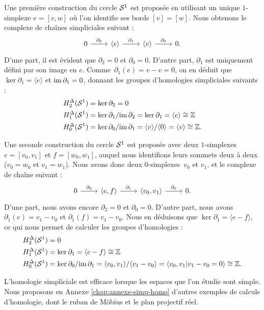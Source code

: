 \begin{exemple}
Une première construction du cercle $\mathcal{S}^{1}$ est proposée en utilisant un unique $1$-simplexe $e=[v,w]$ où l'on identifie ses bords $[v]=[w]$. Nous obtenons le complexe de chaînes simpliciales suivant :
\[\begin{tikzcd}
0\arrow[r,"\partial_2"]& \langle e\rangle\arrow[r, "\partial_1"]&\langle v\rangle\arrow[r,"\partial_0"]&0.
\end{tikzcd}\]
D'une part, il est évident que $\partial_2=0$ et $\partial_0=0$. D'autre part, $\partial_1$ est uniquement défini par son image en $e$. Comme~$\partial_1(e)=v-v=0$, on en déduit que $\ker\partial_1=\langle e\rangle$ et $\mathrm{im}\,\partial_1=0$, donnant les groupes d'homologies simpliciales suivants :
\[\begin{split}
    H^\Delta_2(\mathcal{S}^{1}) &= \ker\partial_2 = 0 \\
    H^\Delta_1(\mathcal{S}^{1}) &= \ker\partial_1/\mathrm{im}\,\partial_2 = \ker\partial_1 = \langle e \rangle\cong\mathbb{Z} \\
    H^\Delta_0(\mathcal{S}^{1}) &= \ker\partial_0/\mathrm{im}\,\partial_1 = \langle v \rangle/\langle 0 \rangle = \langle v \rangle\cong\mathbb{Z}.
\end{split}\]

Une seconde construction du cercle $\mathcal{S}^{1}$ est proposée avec deux $1$-simplexes $e=[v_0,v_1]$ et $f=[w_0,w_1]$, auquel nous identifions leurs sommets deux à deux ($v_0=w_0$ et $v_1=w_1$). Nous avons donc deux $0$-simplexes~$v_0$ et $v_1$, et le complexe de chaîne suivant : 
\[\begin{tikzcd}
0\arrow[r,"\partial_2"]& \langle e,f\rangle\arrow[r, "\partial_1"]&\langle v_0,v_1\rangle\arrow[r,"\partial_0"]&0.
\end{tikzcd}\]
D'une part, nous avons encore $\partial_2=0$ et $\partial_0=0$. D'autre part, nous avons $\partial_1(e)=v_1-v_0$ et $\partial_1(f)=v_1-v_0$. Nous en déduisons que $\ker\partial_1=\langle e-f\rangle$, ce qui nous permet de calculer les groupes d'homologies : \[\begin{split}
H^\Delta_2(\mathcal{S}^{1}) &= 0 \\
H^\Delta_1(\mathcal{S}^{1}) &= \ker\partial_1 = \langle e-f \rangle \cong\mathbb{Z}\\
H^\Delta_0(\mathcal{S}^{1}) &= \ker\partial_0/\mathrm{im}\,\partial_1 = \langle v_0,v_1 \rangle/\langle v_1-v_0 \rangle = \langle v_0,v_1|v_1-v_0=0 \rangle\cong\mathbb{Z}.
\end{split}\]
\end{exemple}

L'homologie simpliciale est efficace lorsque les espaces que l'on étudie sont simple. Nous proposons en Annexe \ref{chap:annexe-simp-homo} d'autres exemples de calculs d'homologie, dont le ruban de Möbius et le plan projectif réel.

